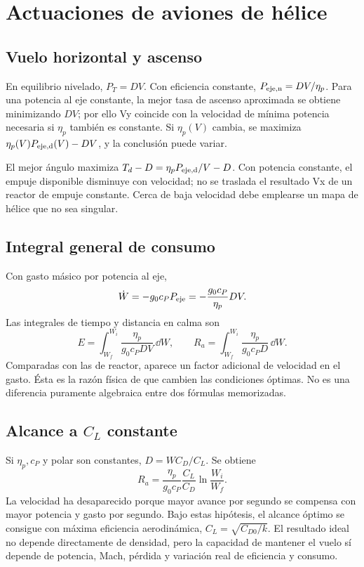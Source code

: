 \chapter{Actuaciones de aviones de hélice}\label{ch:prop-performance}

\section{Vuelo horizontal y ascenso}
En equilibrio nivelado, $P_T=DV$. Con eficiencia constante, $P_{\rm eje,n}=DV/\eta_p$. Para una potencia al eje constante, la mejor tasa de ascenso aproximada se obtiene minimizando $DV$; por ello Vy coincide con la velocidad de mínima potencia necesaria si $\eta_p$ también es constante. Si $\eta_p(V)$ cambia, se maximiza $\eta_p(V)P_{\rm eje,d}(V)-DV$, y la conclusión puede variar.

El mejor ángulo maximiza $T_d-D=\eta_pP_{\rm eje,d}/V-D$. Con potencia constante, el empuje disponible disminuye con velocidad; no se traslada el resultado Vx de un reactor de empuje constante. Cerca de baja velocidad debe emplearse un mapa de hélice que no sea singular.

\section{Integral general de consumo}
Con gasto másico por potencia al eje,
\begin{equation}
\dot W=-g_0c_PP_{\rm eje}=-\frac{g_0c_P}{\eta_p}DV.
\end{equation}
Las integrales de tiempo y distancia en calma son
\begin{equation}
E=\int_{W_f}^{W_i}\frac{\eta_p}{g_0c_PDV}\,\dd W,
\qquad R_a=\int_{W_f}^{W_i}\frac{\eta_p}{g_0c_PD}\,\dd W.
\label{eq:prop-general}
\end{equation}
Comparadas con las de reactor, aparece un factor adicional de velocidad en el gasto. Ésta es la razón física de que cambien las condiciones óptimas. No es una diferencia puramente algebraica entre dos fórmulas memorizadas.

\section{Alcance a $C_L$ constante}
Si $\eta_p,c_P$ y polar son constantes, $D=W C_D/C_L$. Se obtiene
\begin{equation}
R_a=\frac{\eta_p}{g_0c_P}\frac{C_L}{C_D}\ln\frac{W_i}{W_f}.
\label{eq:prop-breguet}
\end{equation}
La velocidad ha desaparecido porque mayor avance por segundo se compensa con mayor potencia y gasto por segundo. Bajo estas hipótesis, el alcance óptimo se consigue con máxima eficiencia aerodinámica, $C_L=\sqrt{C_{D0}/k}$. El resultado ideal no depende directamente de densidad, pero la capacidad de mantener el vuelo sí depende de potencia, Mach, pérdida y variación real de eficiencia y consumo.

